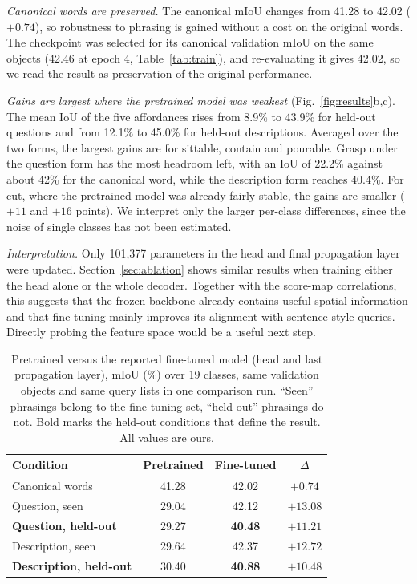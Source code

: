 \documentclass[conference]{IEEEtran}
\begin{document}
\emph{Canonical words are preserved.} The canonical mIoU changes from 41.28 to 42.02 ($+0.74$), so robustness to phrasing is gained without a cost on the original words. The checkpoint was selected for its canonical validation mIoU on the same objects (42.46 at epoch 4, Table~\ref{tab:train}), and re-evaluating it gives 42.02, so we read the result as preservation of the original performance.

\emph{Gains are largest where the pretrained model was weakest} (Fig.~\ref{fig:results}b,c). The mean IoU of the five affordances rises from 8.9\% to 43.9\% for held-out questions and from 12.1\% to 45.0\% for held-out descriptions. Averaged over the two forms, the largest gains are for sittable, contain and pourable. Grasp under the question form has the most headroom left, with an IoU of 22.2\% against about 42\% for the canonical word, while the description form reaches 40.4\%. For cut, where the pretrained model was already fairly stable, the gains are smaller ($+11$ and $+16$ points). We interpret only the larger per-class differences, since the noise of single classes has not been estimated.

\emph{Interpretation.} Only 101,377 parameters in the head and final propagation layer were updated. Section~\ref{sec:ablation} shows similar results when training either the head alone or the whole decoder. Together with the score-map correlations, this suggests that the frozen backbone already contains useful spatial information and that fine-tuning mainly improves its alignment with sentence-style queries. Directly probing the feature space would be a useful next step.

\begin{table}[t]
\caption{Pretrained versus the reported fine-tuned model (head and last propagation layer), mIoU (\%) over 19 classes, same validation objects and same query lists in one comparison run. ``Seen'' phrasings belong to the fine-tuning set, ``held-out'' phrasings do not. Bold marks the held-out conditions that define the result. All values are ours.}
\label{tab:main}
\centering
\small
\begin{tabular}{@{}lccc@{}}
\toprule
Condition & Pretrained & Fine-tuned & $\Delta$ \\
\midrule
Canonical words               & 41.28 & 42.02 & $+0.74$ \\
Question, seen                & 29.04 & 42.12 & $+13.08$ \\
\textbf{Question, held-out}   & 29.27 & \textbf{40.48} & $\mathbf{+11.21}$ \\
Description, seen             & 29.64 & 42.37 & $+12.72$ \\
\textbf{Description, held-out}& 30.40 & \textbf{40.88} & $\mathbf{+10.48}$ \\
\bottomrule
\end{tabular}
\end{table}
\end{document}
